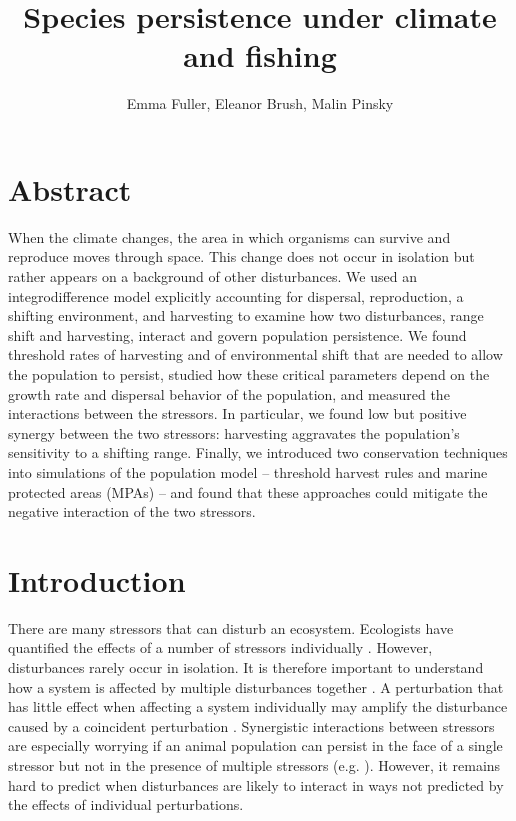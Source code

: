 \documentclass[]{article}
\title{Species persistence under climate and fishing}
\author{Emma Fuller, Eleanor Brush, Malin Pinsky}
\date{}
\begin{document}
\maketitle

\section{Abstract}

When the climate changes, the area in which organisms can survive and reproduce moves through space. 
This change does not occur in isolation but rather appears on a background of other disturbances. We used an 
integrodifference model explicitly accounting for dispersal, reproduction, a shifting environment, and 
harvesting to examine how two disturbances, range shift and harvesting, interact and govern population 
persistence. We found threshold rates of harvesting and of environmental shift that are needed to allow the 
population to persist, studied how these critical parameters depend on the growth rate and dispersal behavior 
of the population, and measured the interactions between the stressors. In particular, we found low but positive 
synergy between the two stressors: harvesting aggravates the population's sensitivity to a shifting range. 
Finally, we introduced two conservation techniques into simulations of the population model -- threshold 
harvest rules and marine protected areas (MPAs) -- and found that 
these approaches could mitigate the negative interaction of the two stressors.  

\section{Introduction}

There are many stressors that can disturb an ecosystem. Ecologists have quantified the effects of a number of stressors individually \citep{Wilcoveetal1998, Crainetal2008, DarlingCote2008}. However, disturbances rarely occur in isolation.  It is therefore important to understand how a system is affected by multiple disturbances together \citep{DoakMorris2010, Fordhametal2013, Foltetal1999}. A perturbation that has little effect when affecting a system individually may amplify the disturbance caused by a coincident perturbation \citep{Crainetal2008, DarlingCote2008}. Synergistic interactions between stressors are especially worrying if an animal population can persist in the face of a single stressor but not in the presence of multiple stressors (e.g.  \citet{Pelletieretal2006}). However, it remains hard to predict when disturbances are likely to interact in ways not predicted by the effects of individual perturbations.
\end{document}
